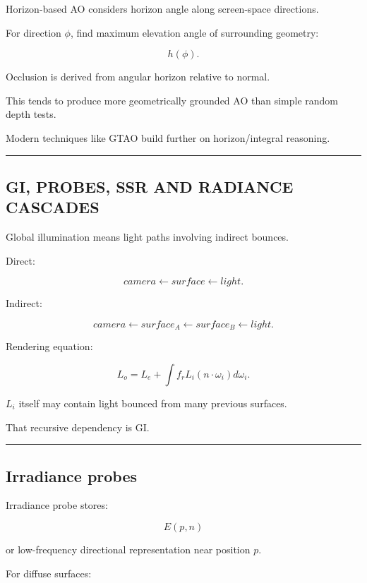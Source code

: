 Horizon-based AO considers horizon angle along screen-space directions.

For direction \(\phi\), find maximum elevation angle of surrounding geometry:

\[
h(\phi).
\]

Occlusion is derived from angular horizon relative to normal.

This tends to produce more geometrically grounded AO than simple random depth tests.

Modern techniques like GTAO build further on horizon/integral reasoning.

\begin{center}\rule{0.5\linewidth}{0.5pt}\end{center}

\subsection{GI, PROBES, SSR AND RADIANCE CASCADES}\label{04-visual-computing-ii-ch040-gi-probes-ssr-and-radiance-cascades}

Global illumination means light paths involving indirect bounces.

Direct:

\[
camera
\leftarrow
surface
\leftarrow
light.
\]

Indirect:

\[
camera
\leftarrow
surface_A
\leftarrow
surface_B
\leftarrow
light.
\]

Rendering equation:

\[
L_o=
L_e+
\int
f_rL_i(n\cdot\omega_i)d\omega_i.
\]

\(L_i\) itself may contain light bounced from many previous surfaces.

That recursive dependency is GI.

\begin{center}\rule{0.5\linewidth}{0.5pt}\end{center}

\subsection{Irradiance probes}\label{04-visual-computing-ii-ch040-irradiance-probes}

Irradiance probe stores:

\[
E(p,n)
\]

or low-frequency directional representation near position \(p\).

For diffuse surfaces:

